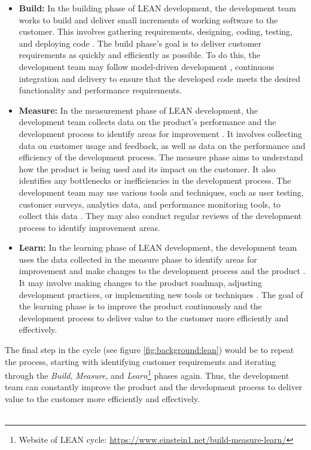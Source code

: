 \begin{itemize}
  \item[] \textbf{Build:} In the building phase of LEAN development, the development team works to build and deliver small increments of working software to the customer. This involves gathering requirements, designing, coding, testing, and deploying code \cite{misc:lean:tutorial}. The build phase's goal is to deliver customer requirements as quickly and efficiently as possible. To do this, the development team may follow model-driven development \cite{misc:lean:mdd}, continuous integration and delivery to ensure that the developed code meets the desired functionality and performance requirements.
  \item[] \textbf{Measure:} In the measurement phase of LEAN development, the development team collects data on the product's performance and the development process to identify areas for improvement \cite{misc:lean:tutorial}. It involves collecting data on customer usage and feedback, as well as data on the performance and efficiency of the development process. The measure phase aims to understand how the product is being used and its impact on the customer. It also identifies any bottlenecks or inefficiencies in the development process. The development team may use various tools and techniques, such as user testing, customer surveys, analytics data, and performance monitoring tools, to collect this data \cite{article:qqa:young, article:qq:helena}. They may also conduct regular reviews of the development process to identify improvement areas.
  \item[] \textbf{Learn:} In the learning phase of LEAN development, the development team uses the data collected in the measure phase to identify areas for improvement and make changes to the development process and the product \cite{misc:lean:tutorial}. It may involve making changes to the product roadmap, adjusting development practices, or implementing new tools or techniques \cite{article:lean:eric}. The goal of the learning phase is to improve the product continuously and the development process to deliver value to the customer more efficiently and effectively.
\end{itemize}
The final step in the cycle (see figure \ref{fig:background:lean}) would be to repeat the process, starting with identifying customer requirements and iterating through the \textit{Build}, \textit{Measure}, and \textit{Learn}\footnote{Website of LEAN cycle: \url{https://www.einstein1.net/build-measure-learn/}} phases again.
Thus, the development team can constantly improve the product and the development process to deliver value to the customer more efficiently and effectively. \\\\
